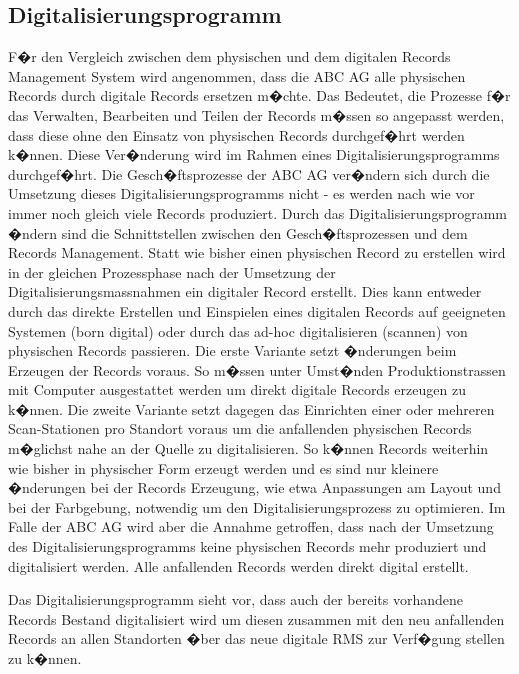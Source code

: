 \documentclass[a4paper,twoside,10pt]{report}
\begin{document}
\subsection{Digitalisierungsprogramm}
\label{subsec:digiprog}
F�r den Vergleich zwischen dem physischen und dem digitalen Records Management System wird angenommen, dass die ABC AG alle physischen Records durch digitale Records ersetzen m�chte. Das Bedeutet, die Prozesse f�r das Verwalten, Bearbeiten und Teilen der Records m�ssen so angepasst werden, dass diese ohne den Einsatz von physischen Records durchgef�hrt werden k�nnen. Diese Ver�nderung wird im Rahmen eines Digitalisierungsprogramms durchgef�hrt. Die Gesch�ftsprozesse der ABC AG ver�ndern sich durch die Umsetzung dieses Digitalisierungsprogramms nicht - es werden nach wie vor immer noch gleich viele Records produziert. Durch das Digitalisierungsprogramm �ndern sind die Schnittstellen zwischen den Gesch�ftsprozessen und dem Records Management. Statt wie bisher einen physischen Record zu erstellen wird in der gleichen Prozessphase nach der Umsetzung der Digitalisierungsmassnahmen ein digitaler Record erstellt. Dies kann entweder durch das direkte Erstellen und Einspielen eines digitalen Records auf geeigneten Systemen (born digital) oder durch das ad-hoc digitalisieren (scannen) von physischen Records passieren. Die erste Variante setzt �nderungen beim Erzeugen der Records voraus. So m�ssen unter Umst�nden Produktionstrassen mit Computer ausgestattet werden um direkt digitale Records erzeugen zu k�nnen. Die zweite Variante setzt dagegen das Einrichten einer oder mehreren Scan-Stationen pro Standort voraus um die anfallenden physischen Records m�glichst nahe an der Quelle zu digitalisieren. So k�nnen Records weiterhin wie bisher in physischer Form erzeugt werden und es sind nur kleinere �nderungen bei der Records Erzeugung, wie etwa Anpassungen am Layout und bei der Farbgebung, notwendig um den Digitalisierungsprozess zu optimieren. Im Falle der ABC AG wird aber die Annahme getroffen, dass nach der Umsetzung des Digitalisierungsprogramms keine physischen Records mehr produziert und digitalisiert werden. Alle anfallenden Records werden direkt digital erstellt.

Das Digitalisierungsprogramm sieht vor, dass auch der bereits vorhandene Records Bestand digitalisiert wird um diesen zusammen mit den neu anfallenden Records an allen Standorten �ber das neue digitale \ac{RMS} zur Verf�gung stellen zu k�nnen. 

\end{document}
